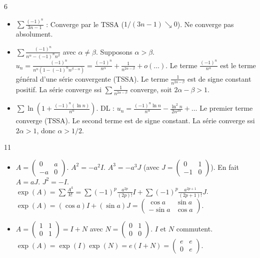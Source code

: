\begin{correction}{6}
\begin{itemize}
    \item $\sum \frac{(-1)^n}{3n-1}$ : Converge par le TSSA ($1/(3n-1) \searrow 0$). Ne converge pas absolument.
    \item $\sum \frac{(-1)^n}{n^\alpha - (-1)^n n^\beta}$ avec $\alpha \neq \beta$.
    Supposons $\alpha > \beta$.
    $u_n = \frac{(-1)^n}{n^\alpha(1 - (-1)^n n^{\beta-\alpha})} = \frac{(-1)^n}{n^\alpha} + \frac{1}{n^{2\alpha-\beta}} + o(\dots)$.
    Le terme $\frac{(-1)^n}{n^\alpha}$ est le terme général d'une série convergente (TSSA).
    Le terme $\frac{1}{n^{2\alpha-\beta}}$ est de signe constant positif.
    La série converge ssi $\sum \frac{1}{n^{2\alpha-\beta}}$ converge, soit $2\alpha - \beta > 1$.
    \item $\sum \ln(1 + \frac{(-1)^n (\ln n)}{n^\alpha})$.
    DL : $u_n = \frac{(-1)^n \ln n}{n^\alpha} - \frac{\ln^2 n}{2 n^{2\alpha}} + \dots$
    Le premier terme converge (TSSA). Le second terme est de signe constant.
    La série converge ssi $2\alpha > 1$, donc $\alpha > 1/2$.
\end{itemize}
\end{correction}

\begin{correction}{11}
\begin{itemize}
    \item $A = \begin{pmatrix} 0 & a \\ -a & 0 \end{pmatrix}$.
    $A^2 = -a^2 I$. $A^3 = -a^3 J$ (avec $J=\begin{pmatrix} 0 & 1 \\ -1 & 0 \end{pmatrix}$).
    En fait $A = a J$. $J^2 = -I$.
    $\exp(A) = \sum \frac{A^k}{k!} = \sum (-1)^p \frac{a^{2p}}{(2p)!} I + \sum (-1)^p \frac{a^{2p+1}}{(2p+1)!} J$.
    $\exp(A) = (\cos a) I + (\sin a) J = \begin{pmatrix} \cos a & \sin a \\ -\sin a & \cos a \end{pmatrix}$.
    \item $A = \begin{pmatrix} 1 & 1 \\ 0 & 1 \end{pmatrix} = I + N$ avec $N=\begin{pmatrix} 0 & 1 \\ 0 & 0 \end{pmatrix}$.
    $I$ et $N$ commutent. $\exp(A) = \exp(I)\exp(N) = e (I+N) = \begin{pmatrix} e & e \\ 0 & e \end{pmatrix}$.
\end{itemize}
\end{correction}

